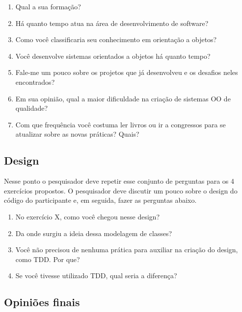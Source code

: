 \begin{enumerate}
	\item Qual a sua formação?

	\item Há quanto tempo atua na área de desenvolvimento de software?

	\item Como você classificaria seu conhecimento em orientação a objetos?

	\item Você desenvolve sistemas orientados a objetos há quanto tempo?	

	\item Fale-me um pouco sobre os projetos que já desenvolveu e os desafios 
	neles encontrados?

	\item Em sua opinião, qual a maior dificuldade na criação de sistemas OO de
	qualidade?

	\item Com que frequência você costuma ler livros ou ir a congressos para se 
	atualizar sobre as novas práticas? Quais?

\end{enumerate}

\subsection{Design}

Nesse ponto o pesquisador deve repetir esse conjunto de perguntas
para os 4 exercícios propostos.
O pesquisador deve discutir um pouco sobre o design do código do participante e, em seguida,
fazer as perguntas abaixo.

\begin{enumerate}
	
	\item No exercício X, como você chegou nesse design?
	
	\item Da onde surgiu a ideia dessa modelagem de classes?
	
	\item Você não precisou de nenhuma prática para auxiliar na criação do design, como TDD. Por que?
	
	\item Se você tivesse utilizado TDD, qual seria a diferença?
	
\end{enumerate}

\subsection{Opiniões finais}

